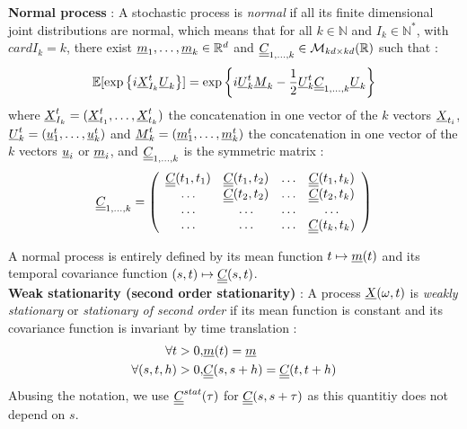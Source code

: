 {\bf Normal process} : A stochastic process is {\itshape normal}  if all its finite dimensional joint distributions are normal, which means that for all $k  \in  \mathbb{N}$ and $I_k \in \mathbb{N}^*$, with $card I_k = k$, there exist ${\underline{m}}_1,\dots,{\underline{m}}_k\in\mathbb{R}^d$ and ${\underline{\underline{C}}}_{1,\dots,k}\in\mathcal{M}_{kd\times kd}(\mathbb{R})$ such that :
\begin{eqnarray}
   \mathbb{E}[\exp\left\{i{\underline{X}}_{I_k}^t {\underline{U}}_{k}  \right\}] = 
\exp\left\{i{\underline{U}}_{k}^t{\underline{M}}_{k}-\frac{1}{2}{\underline{U}}_{k}^t{\underline{\underline{C}}}_{1,\dots,k}{\underline{U}}_{k}\right\}
\end{eqnarray}
where ${\underline{X}}_{I_k}^t = ({\underline{X}}_{t_1}^t, \hdots, {\underline{X}}_{t_k}^t)$ the concatenation in one vector of the $k$ vectors ${\underline{X}}_{t_i}$, ${\underline{U}}_{k}^t = ({\underline{u}}_{1}^t, \hdots, {\underline{u}}_{k}^t)$ and ${\underline{M}}_{k}^t = ({\underline{m}}_{1}^t, \hdots, {\underline{m}}_{k}^t)$  the concatenation in one vector of the $k$ vectors ${\underline{u}}_{i}$ or ${\underline{m}}_{i}$, and ${\underline{\underline{C}}}_{1,\dots,k}$ is the symmetric matrix : 
\begin{equation}\label{covMatrix}
{\underline{\underline{C}}}_{1,\dots,k} = \left(
\begin{array}{cccc}
  {\underline{\underline{C}}}(t_1, t_1) & {\underline{\underline{C}}}(t_1, t_2) & \hdots & {\underline{\underline{C}}}(t_1, t_{k}) \\
   \hdots &{\underline{\underline{C}}}(t_2, t_2)  & \hdots & {\underline{\underline{C}}}(t_2, t_{k}) \\
  \hdots & \hdots & \hdots & \hdots \\
   \hdots & \hdots & \hdots & {\underline{\underline{C}}}(t_{k}, t_{k}) 
\end{array}
\right)
\end{equation}

A normal process is entirely defined by its mean function $t \mapsto {\underline{m}}(t)$ and its temporal covariance function  $(s,t) \mapsto {\underline{\underline{C}}}(s,t)$.\\


{\bf Weak stationarity (second order stationarity) } : A process ${\underline{X}}(\omega,t)$ is \emph{ weakly stationary} or \emph{stationary of second order} if its mean function is constant and its covariance function is invariant by time translation : 
\begin{eqnarray}\label{stat2order}
 \forall t>0,&   {\underline{m}}(t)   = {\underline{m}} \\
 \forall (s,t,h) >0,  &  {\underline{\underline{C}}}(s,s+h)  = {\underline{\underline{C}}}(t,t+h)
\end{eqnarray}
Abusing the notation, we use ${\underline{\underline{C}}}^{stat}(\tau)$ for ${\underline{\underline{C}}}(s, s+\tau)$ as this quantitiy does not depend on $s$.\\

